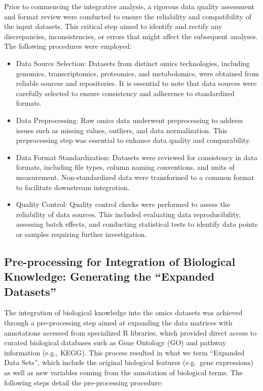 \documentclass[a4paper, nobind]{templates/ociamthesis}
\begin{document}
Prior to commencing the integrative analysis, a rigorous data quality assessment and format review were conducted to ensure the reliability and compatibility of the input datasets. This critical step aimed to identify and rectify any discrepancies, inconsistencies, or errors that might affect the subsequent analyses. The following procedures were employed:

\begin{itemize}
\item
  Data Source Selection: Datasets from distinct omics technologies, including genomics, transcriptomics, proteomics, and metabolomics, were obtained from reliable sources and repositories. It is essential to note that data sources were carefully selected to ensure consistency and adherence to standardized formats.
\item
  Data Preprocessing: Raw omics data underwent preprocessing to address issues such as missing values, outliers, and data normalization. This preprocessing step was essential to enhance data quality and comparability.
\item
  Data Format Standardization: Datasets were reviewed for consistency in data formats, including file types, column naming conventions, and units of measurement. Non-standardized data were transformed to a common format to facilitate downstream integration.
\item
  Quality Control: Quality control checks were performed to assess the reliability of data sources. This included evaluating data reproducibility, assessing batch effects, and conducting statistical tests to identify data points or samples requiring further investigation.
\end{itemize}

\hypertarget{pre-processing-for-integration-of-biological-knowledge-generating-the-expanded-datasets}{%
\subsection{Pre-processing for Integration of Biological Knowledge: Generating the ``Expanded Datasets''}\label{pre-processing-for-integration-of-biological-knowledge-generating-the-expanded-datasets}}

The integration of biological knowledge into the omics datasets was achieved through a pre-processing step aimed at expanding the data matrices with annotations accessed from specialized R libraries, which provided direct access to curated biological databases such as Gene Ontology (GO) and pathway information (e.g., KEGG). This process resulted in what we term ``Expanded Data Sets'', which include the original biological features (e.g.~gene expressions) as well as new variables coming from the annotation of biological terms. The following steps detail the pre-processing procedure:
\end{document}

